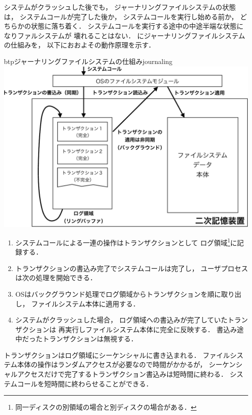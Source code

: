 システムがクラッシュした後でも，
ジャーナリングファイルシステムの状態は，
システムコールが完了した後か，
システムコールを実行し始める前か，
どちらかの状態に落ち着く．
システムコールを実行する途中の中途半端な状態になりファルシステムが
壊れることはない．
にジャーナリングファイルシステムの仕組みを，
以下におおよその動作原理を示す．

\begin{myfig}{btp}{ジャーナリングファイルシステムの仕組み}{journaling}
  \includegraphics[scale=.75]{Fig/journaling-crop.pdf}
\end{myfig}

\begin{enumerate}
\item システムコールによる一連の操作はトランザクションとして
  ログ領域\footnote{同一ディスクの別領域の場合と別ディスクの場合がある．
  }に記録する．
\item トランザクションの書込み完了でシステムコールは完了し，
  ユーザプロセスは次の処理を開始できる．
\item OSはバックグラウンド処理でログ領域からトランザクションを順に取り出し，
  ファイルシステム本体に適用する．
\item システムがクラッシュした場合，
  ログ領域への書込みが完了していたトランザクションは
  再実行しファイルシステム本体に完全に反映する．
  書込み途中だったトランザクションは無視する．
\end{enumerate}

トランザクションはログ領域にシーケンシャルに書き込まれる．
ファイルシステム本体の操作はランダムアクセスが必要なので時間がかかるが，
シーケンシャルアクセスだけで完了するトランザクション書込みは短時間に終わる．
システムコールを短時間に終わらせることができる．


